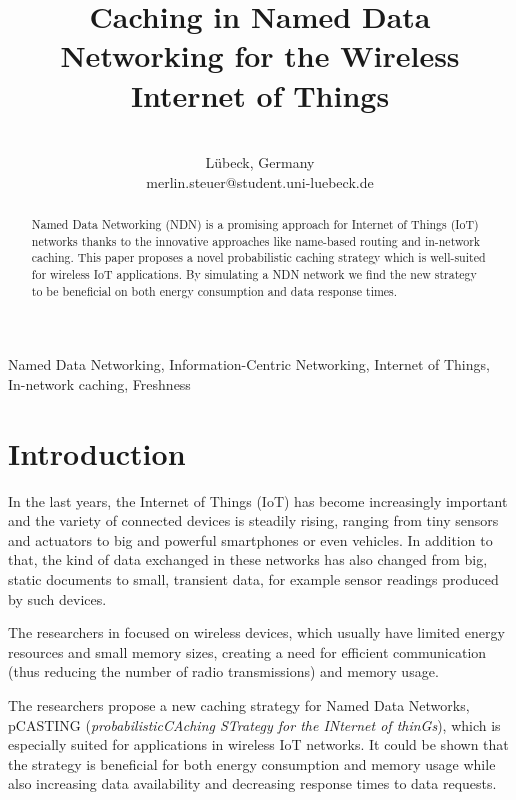 \documentclass[conference]{IEEEtran}
\begin{document}
\title{Caching in Named Data Networking for the Wireless Internet of Things}

\author{
\\
Lübeck, Germany \\
merlin.steuer@student.uni-luebeck.de
}

\maketitle

\begin{abstract}
Named Data Networking (NDN) is a promising approach for Internet of Things (IoT) networks thanks to the innovative approaches like name-based routing and in-network caching. This paper proposes a novel probabilistic caching strategy which is well-suited for wireless IoT applications. By simulating a NDN network we find the new strategy to be beneficial on both energy consumption and data response times.
\end{abstract}

\begin{IEEEkeywords}
    Named Data Networking, Information-Centric
    Networking, Internet of Things, In-network caching, Freshness
\end{IEEEkeywords}

\section{Introduction}

In the last years, the Internet of Things (IoT) has become increasingly important and the variety of connected devices is steadily rising, ranging from tiny sensors and actuators to big and powerful smartphones or even vehicles. In addition to that, the kind of data exchanged in these networks has also changed from big, static documents to small, transient data, for example sensor readings produced by such devices.

The researchers in \cite{Hail2015} focused on wireless devices, which usually have limited energy resources and small memory sizes, creating a need for efficient communication (thus reducing the number of radio transmissions) and memory usage.

The researchers propose a new caching strategy for Named Data Networks, {pCASTING} (\textit{probabilisticCAching STrategy for the INternet of thinGs}), which is especially suited for applications in wireless IoT networks. It could be shown that the strategy is beneficial for both energy consumption and memory usage while also increasing data availability and decreasing response times to data requests.
\end{document}
